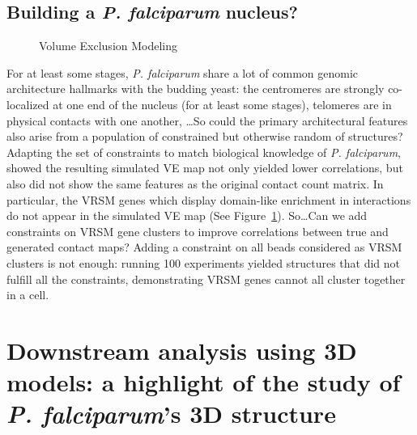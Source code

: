 \documentclass[2columns]{article}
\begin{document}
\subsection*{Building a {\em P. falciparum} nucleus?}

\begin{figure}
\caption{Volume Exclusion Modeling}{}
\label{fig:ve_modeling}
\end{figure}

For at least some stages, {\em P. falciparum} share a lot of common genomic
architecture hallmarks with the budding yeast: the centromeres are strongly
co-localized at one end of the nucleus (for at least some stages),
telomeres are in physical contacts with one another,
\dots So could the primary architectural features also arise from a population
of constrained but otherwise random of structures? Adapting the set of
constraints to match biological knowledge of {\em P. falciparum},
\citet{ay:three-dimensional} showed the resulting simulated VE map not only
yielded lower correlations, but also did not show the same features as the
original contact count matrix. In particular, the VRSM genes which display
domain-like enrichment in interactions do not appear in the simulated VE map
(See Figure~\ref{fig:ve_modeling}). So\dots Can we add constraints on VRSM
gene clusters to improve correlations between true and generated contact maps?
Adding a constraint on all beads considered as VRSM clusters is not enough:
running 100 experiments yielded structures that did not fulfill all the
constraints, demonstrating VRSM genes cannot all cluster together in a cell.

\section*{Downstream analysis using 3D models: a highlight of the study of
{\em P. falciparum}'s 3D structure}
\end{document}

